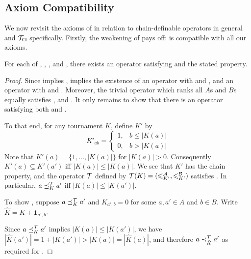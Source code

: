 \subsection{Axiom Compatibility}

We now revisit the axioms of  in relation to
chain-definable operators in general and ${\mathcal{T}_{\mathsf{CI}}}$ specifically. Firstly,
the weakening of \chainmin{} pays off: \chaindef{} is
compatible with all our axioms.

\begin{theorem}
    \label{tourn_result_chaindef_axiom_compatibilities}

    For each of \anon{}, \dualaxiom{}, \iim{},
    \mon{} and \posresp{}, there exists an operator satisfying
    \chaindef{} and the stated property.

\end{theorem}

\begin{proof}

    Since \chainmin{} implies \chaindef{},
     implies the existence of an
    operator with \chaindef{} and \dualaxiom{}, and an operator
    with \chaindef{} and \mon{}.  Moreover, the trivial
    operator which ranks all $A$s and $B$s equally satisfies
    \chaindef{}, \anon{}
    and \iim{}. It only remains to show that there is an operator
    satisfying both \chaindef{} and \posresp{}.

    To that end, for any tournament $K$, define $K'$ by
    \[
        K'_{ab} = \begin{cases}
            1 ,& b \le |K(a)| \\
            0 ,& b > |K(a)|
        \end{cases}
    \]
    Note that $K'(a) = \{1,\ldots,|K(a)|\}$ for $|K(a)| > 0$. Consequently
    $K'(a) \subseteq K'(a')$ iff $|K(a)| \le |K(a)|$. We see that $K'$ has the
    chain property, and the operator $\mathcal{T}$ defined by $\mathcal{T}(K) =
    ({\leqslant^{\mathcal{A}}_{K'}}, {\leqslant^{\mathcal{B}}_{K'}})$ satisfies \chaindef{}. In
    particular, $a \preceq_K^{\mathcal{T}} a'$ iff $|K(a)| \le |K(a')|$.

    To show \posresp{}, suppose $a \preceq_K^{\mathcal{T}} a'$ and $K_{a',b} = 0$
    for some $a, a' \in A$ and $b \in B$. Write $\hat{K} = K + \bm{1}_{a',b}$.

    Since $a \preceq_K^{\mathcal{T}} a'$ implies $|K(a)| \le |K(a')|$, we have
    $|\hat{K}(a')| = 1 + |K(a')| > |K(a)| = |\hat{K}(a)|$, and therefore $a
    \prec_{\hat{K}}^{\mathcal{T}} a'$ as required for \posresp{}.
\end{proof}


